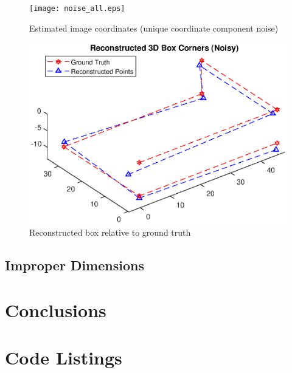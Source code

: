\documentclass[12pt]{article}
\begin{document}
\begin{figure}[h]
	\centering %
	\captionsetup{justification=centering}
	\begin{minipage}{0.5\textwidth}
		\centering
		\texttt{[image: noise\_all.eps]}
		\caption{Estimated image coordinates \newline(unique coordinate component noise)} \label{noiseall}
	\end{minipage}\hfill
	\begin{minipage}{0.5\textwidth}
		\centering %
		\includegraphics[width=1\textwidth]{noise_all_recon.eps}
		\caption{Reconstructed box relative to ground truth} \label{noiseallrecon}
	\end{minipage}
\end{figure}

\subsection{Improper Dimensions}



\section{Conclusions}



\appendix %
\newpage

\section{Code Listings}\label{code}
\end{document}
